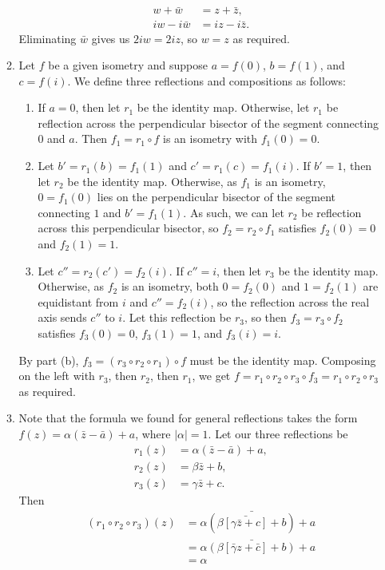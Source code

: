 \begin{enumerate}
\begin{enumerate}
\begin{align*}
w + \bar{w} &= z + \bar{z}, \\
iw - i\bar{w} &= iz - i\bar{z}.
\end{align*}
Eliminating $\bar{w}$ gives us $2iw = 2iz$, so $w = z$ as required.
\item Let $f$ be a given isometry and suppose $a = f(0)$, $b = f(1)$, and $c = f(i)$. We define three reflections and compositions as follows:
\begin{enumerate}
\item If $a = 0$, then let $r_1$ be the identity map. Otherwise, let $r_1$ be reflection across the perpendicular bisector of the segment connecting $0$ and $a$. Then $f_1 = r_1\circ f$ is an isometry with $f_1(0) = 0$.
\item Let $b' = r_1(b) = f_1(1)$ and $c' = r_1(c) = f_1(i)$. If $b' = 1$, then let $r_2$ be the identity map. Otherwise, as $f_1$ is an isometry, $0 = f_1(0)$ lies on the perpendicular bisector of the segment connecting $1$ and $b' = f_1(1)$. As such, we can let $r_2$ be reflection across this perpendicular bisector, so $f_2 = r_2\circ f_1$ satisfies $f_2(0) = 0$ and $f_2(1) = 1$. 
\item Let $c'' = r_2(c') = f_2(i)$. If $c'' = i$, then let $r_3$ be the identity map. Otherwise, as $f_2$ is an isometry, both $0 = f_2(0)$ and $1 = f_2(1)$ are equidistant from $i$ and $c'' = f_2(i)$, so the reflection across the real axis sends $c''$ to $i$. Let this reflection be $r_3$, so then $f_3 = r_3\circ f_2$ satisfies $f_3(0) = 0$, $f_3(1) = 1$, and $f_3(i) = i$.
\end{enumerate}
By part (b), $f_3 = (r_3\circ r_2\circ r_1)\circ f$ must be the identity map. Composing on the left with $r_3$, then $r_2$, then $r_1$, we get $f = r_1\circ r_2\circ r_3\circ f_3 = r_1\circ r_2\circ r_3$ as required.
\item Note that the formula we found for general reflections takes the form $f(z) = \alpha (\bar{z} - \bar{a}) + a$, where $\lvert\alpha\rvert = 1$. Let our three reflections be
\begin{align*}
r_1(z) &= \alpha(\bar{z} - \bar{a}) + a, \\
r_2(z) &= \beta\bar{z} + b, \\
r_3(z) &= \gamma\bar{z} + c.
\end{align*}
Then
\begin{align*}
(r_1\circ r_2\circ r_3)(z) &= \alpha\bar{(\beta\bar{[\gamma\bar{z} + c]} + b)} + a \\
&= \alpha\bar{(\beta [\bar{\gamma} z + \bar{c}] + b)} + a \\
&= \alpha
\end{align*}
\end{enumerate}
\end{enumerate}